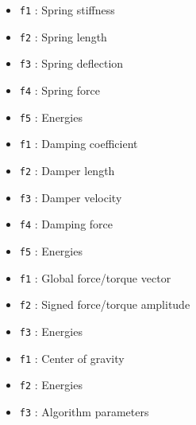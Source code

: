 

\begin{itemize}
\item{\tt f1} : Spring stiffness
\item{\tt f2} : Spring length
\item{\tt f3} : Spring deflection
\item{\tt f4} : Spring force
\item{\tt f5} : Energies
\end{itemize}

\clearpage




\begin{itemize}
\item{\tt f1} : Damping coefficient
\item{\tt f2} : Damper length
\item{\tt f3} : Damper velocity
\item{\tt f4} : Damping force
\item{\tt f5} : Energies
\end{itemize}




\begin{itemize}
\item{\tt f1} : Global force/torque vector
\item{\tt f2} : Signed force/torque amplitude
\item{\tt f3} : Energies
\end{itemize}




\begin{itemize}
\item{\tt f1} : Center of gravity
\item{\tt f2} : Energies
\item{\tt f3} : Algorithm parameters
\end{itemize}

